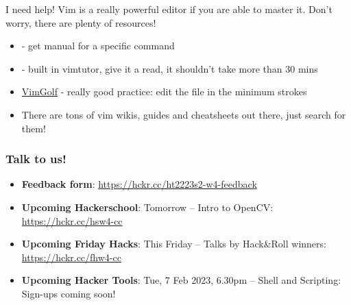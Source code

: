 \documentclass[12pt]{beamer}
\begin{document}
\begin{frame}{I need help!}
    Vim is a really powerful editor if you are able to master it. Don't worry, there are plenty of resources!
    \begin{itemize}
        \item {} - get manual for a specific command
        \item {} - built in vimtutor, give it a read, it shouldn't take more than 30 mins
        \item \href{https://www.vimgolf.com}{VimGolf} - really good practice: edit the file in the minimum strokes
        \item There are tons of vim wikis, guides and cheatsheets out there, just search for them!
    \end{itemize}{}
\end{frame}{}

\begin{frame}
  \frametitle{Talk to us!}
  \begin{itemize}
    \item \textbf{Feedback form}: \url{https://hckr.cc/ht2223s2-w4-feedback}

    \item \textbf{Upcoming Hackerschool}:
          Tomorrow -- Intro to OpenCV: \url{https://hckr.cc/hsw4-cc}

    \item \textbf{Upcoming Friday Hacks}:
          This Friday -- Talks by Hack&Roll winners: \url{https://hckr.cc/fhw4-cc}

    \item \textbf{Upcoming Hacker Tools}:
          Tue, 7 Feb 2023, 6.30pm -- Shell and Scripting: Sign-ups coming soon!
  \end{itemize}
\end{frame}
\end{document}
